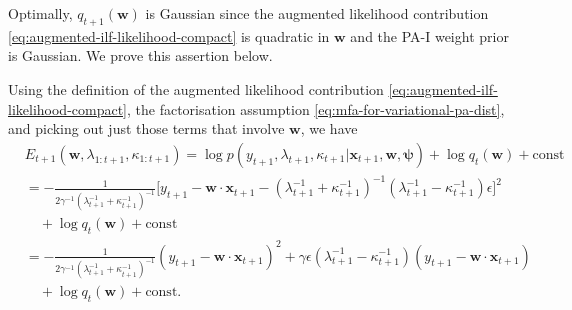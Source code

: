 Optimally, $q_{t+1}(\mathbf{w})$ is Gaussian since the augmented likelihood contribution \eqref{eq:augmented-ilf-likelihood-compact} is quadratic in $\mathbf{w}$ and the PA-I weight prior is Gaussian. We prove this assertion below.

Using the definition of the augmented likelihood contribution \eqref{eq:augmented-ilf-likelihood-compact}, the factorisation assumption \eqref{eq:mfa-for-variational-pa-dist}, and picking out just those terms that involve $\mathbf{w}$, we have
\begin{align}
	& E_{t+1}(\mathbf{w}, \lambda_{1:t+1}, \kappa_{1:t+1})
	= \log p(y_{t+1}, \lambda_{t+1}, \kappa_{t+1}|\mathbf{x}_{t+1}, \mathbf{w}, \boldsymbol{\psi})
	+ \log q_{t}(\mathbf{w}) + \text{const}
	\nonumber \\
	&= -\frac{1}{2\gamma^{-1}(\lambda_{t+1}^{-1} + \kappa_{t+1}^{-1})^{-1}}\big[y_{t+1} - \mathbf{w}\cdot\mathbf{x}_{t+1} - (\lambda_{t+1}^{-1} + \kappa_{t+1}^{-1})^{-1}(\lambda_{t+1}^{-1} - \kappa_{t+1}^{-1})\epsilon\big]^2
	\nonumber \\
	& \quad + \log q_{t}(\mathbf{w}) + \text{const}
	\nonumber \\
	&= -\frac{1}{2\gamma^{-1}(\lambda_{t+1}^{-1} + \kappa_{t+1}^{-1})^{-1}}(y_{t+1} - \mathbf{w}\cdot\mathbf{x}_{t+1})^2
	+ \gamma\epsilon(\lambda_{t+1}^{-1} - \kappa_{t+1}^{-1})(y_{t+1} - \mathbf{w}\cdot\mathbf{x}_{t+1})
	\nonumber \\
	& \quad + \log q_{t}(\mathbf{w}) + \text{const}.
\end{align}
